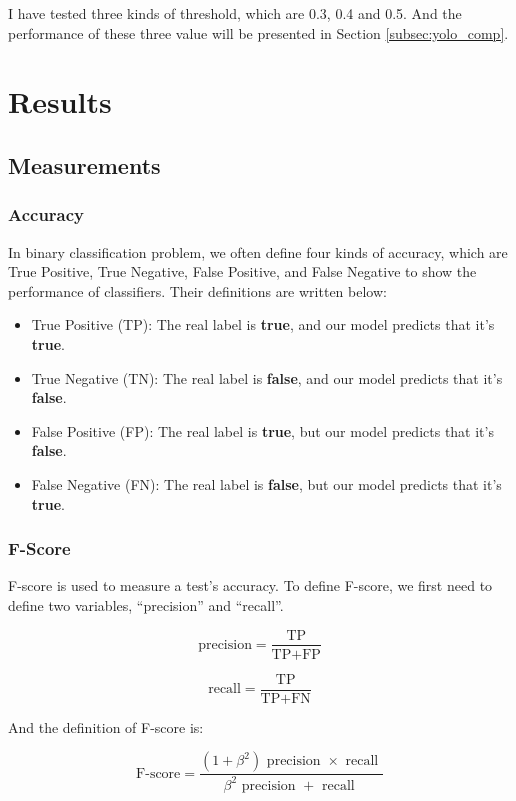 \documentclass{article}[12pt]
\begin{document}
I have tested three kinds of threshold, which are 0.3, 0.4 and 0.5. And the performance of these
three value will be presented in Section \ref{subsec:yolo_comp}.

\section{Results} \label{sec:res}
\subsection{Measurements}
\subsubsection{Accuracy}
In binary classification problem, we often define four kinds of accuracy, 
which are True Positive, True Negative, False Positive, and False Negative 
to show the performance of classifiers. Their definitions are written below:
\begin{itemize}
    \item True Positive (TP): The real label is \textbf{true}, 
    and our model predicts that it's \textbf{true}.
    \item True Negative (TN): The real label is \textbf{false}, 
    and our model predicts that it's \textbf{false}.
    \item False Positive (FP): The real label is \textbf{true}, 
    but our model predicts that it's \textbf{false}.
    \item False Negative (FN): The real label is \textbf{false}, 
    but our model predicts that it's \textbf{true}.
\end{itemize}
\subsubsection{F-Score}
F-score is used to measure a test's accuracy. 
To define F-score, we first need to define two variables, 
``precision'' and ``recall''.

\begin{equation}
    \text {precision}=\frac{\text{TP}}{\text{TP}+\text{FP}}
\end{equation}

\begin{equation}
    \text {recall}=\frac{\text{TP}}{\text{TP}+\text{FN}}
\end{equation}

And the definition of F-score is:

\begin{equation}
    \text {F-score}=\frac{\left(1+\beta^{2}\right) \text { precision } \times \text { recall }}{\beta^{2} \text { precision }+\text { recall }}
\end{equation}
\end{document}
